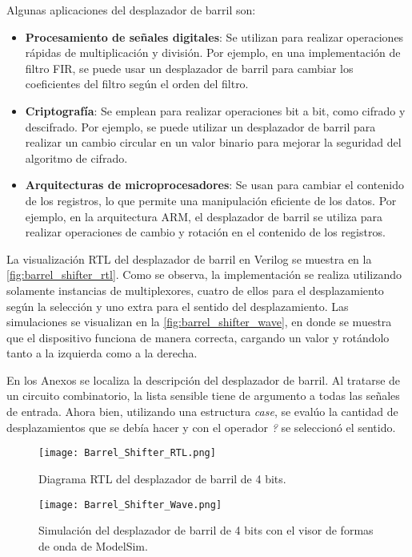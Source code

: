 Algunas aplicaciones del desplazador de barril son:

\begin{itemize}
	\item \textbf{Procesamiento de señales digitales}: Se utilizan para realizar operaciones rápidas de multiplicación y división. Por ejemplo, en una implementación de filtro FIR, se puede usar un desplazador de barril para cambiar los coeficientes del filtro según el orden del filtro.
	\item \textbf{Criptografía}: Se emplean para realizar operaciones bit a bit, como cifrado y descifrado. Por ejemplo, se puede utilizar un desplazador de barril para realizar un cambio circular en un valor binario para mejorar la seguridad del algoritmo de cifrado.
	\item \textbf{Arquitecturas de microprocesadores}: Se usan para cambiar el contenido de los registros, lo que permite una manipulación eficiente de los datos. Por ejemplo, en la arquitectura ARM, el desplazador de barril se utiliza para realizar operaciones de cambio y rotación en el contenido de los registros. \cite{Mathur_2023}
\end{itemize}

La visualización RTL del desplazador de barril en Verilog se muestra en la \autoref{fig:barrel_shifter_rtl}. Como se observa, la implementación se realiza utilizando solamente instancias de multiplexores, cuatro de ellos para el desplazamiento según la selección y uno extra para el sentido del desplazamiento. Las simulaciones se visualizan en la \autoref{fig:barrel_shifter_wave}, en donde se muestra que el dispositivo funciona de manera correcta, cargando un valor y rotándolo tanto a la izquierda como a la derecha.

En los Anexos se localiza la descripción del desplazador de barril. Al tratarse de un circuito combinatorio, la lista sensible tiene de argumento a todas las señales de entrada. Ahora bien, utilizando una estructura \textit{case}, se evalúo la cantidad de desplazamientos que se debía hacer y con el operador \textit{?} se seleccionó el sentido.

\begin{figure}[ht]
	\centering
	\texttt{[image: Barrel\_Shifter\_RTL.png]}
	\caption{Diagrama RTL del desplazador de barril de 4 bits. \label{fig:barrel_shifter_rtl}}
\end{figure}

\begin{figure}[ht]
	\centering
	\texttt{[image: Barrel\_Shifter\_Wave.png]}
	\caption{Simulación del desplazador de barril de 4 bits con el visor de formas de onda de ModelSim. \label{fig:barrel_shifter_wave}}
\end{figure}